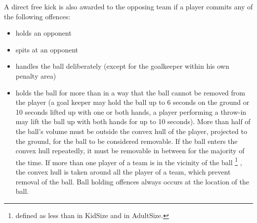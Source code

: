 
\bigskip


A direct free kick is also awarded to the opposing team if a player commits
any of the following %
offences:

\begin{itemize}
\item holds an opponent
\item spits at an opponent
\item handles the ball deliberately
    (except for the goalkeeper within his own penalty area)
\item {}holds the ball for more than   in a way that the
  ball cannot be removed from the player (a goal keeper may hold the ball up to
  6 seconds on the ground or 10 seconds lifted up with one or both hands,
    a player performing a throw-in may lift the ball up with both hands
    for up to 10 seconds). More than half of the ball's volume must be outside
  the convex hull of the player, projected to the ground, for the ball to be
  considered removable. If the ball enters the convex hull repeatedly, it must
  be removable in between for the majority of the time. If more than one player
  of a team is in the vicinity of the ball
    \footnote{defined as less than   in KidSize and   in AdultSize.}
  , the convex hull is taken around all
  the player of a team, which prevent removal of the ball.
  Ball holding offences always occurs at the location of the ball.
\end{itemize}

